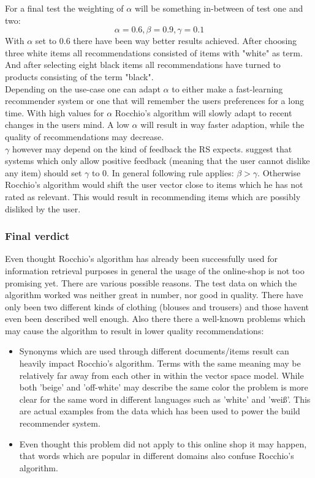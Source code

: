 \noindent
For a final test the weighting of $\alpha$ will be something in-between of test one and two:
$$\alpha = 0.6, \beta = 0.9, \gamma = 0.1$$
With $\alpha$ set to 0.6 there have been way better results achieved.
After choosing three white items all recommendations consisted of items with "white" as term.
\\
And after selecting eight black items all recommendations have turned to products consisting of the term "black".
\\

\noindent
Depending on the use-case one can adapt $\alpha$ to either make a fast-learning recommender system or one that will remember the users preferences for a long time.
With high values for $\alpha$ Rocchio's algorithm will slowly adapt to recent changes in the users mind.
A low $\alpha$ will result in way faster adaption, while the quality of recommendations may decrease.
\\

\noindent
$\gamma$ however may depend on the kind of feedback the RS expects.
\citeauthor{manning:2009} suggest that systems which only allow positive feedback (meaning that the user cannot dislike any item) should set $\gamma$ to 0.\citep[p.~183]{manning:2009}
In general following rule applies: $\beta > \gamma$.
Otherwise Rocchio's algorithm would shift the user vector close to items which he has not rated as relevant.
This would result in recommending items which are possibly disliked by the user.



\subsubsection{Final verdict}
Even thought Rocchio's algorithm has already been successfully used for information retrieval purposes in general \citep[p.~183]{manning:2009} the usage of the online-shop is not too promising yet.
There are various possible reasons.
The test data on which the algorithm worked was neither great in number, nor good in quality.
There have only been two different kinds of clothing (blouses and trousers) and those havent even been described well enough.
Also there there a well-known problems which may cause the algorithm to result in lower quality recommendations:
\begin{itemize}
    \item Synonyms which are used through different documents/items result can heavily impact Rocchio's algorithm.
        Terms with the same meaning may be relatively far away from each other in within the vector space model.
        \citep[p.~184]{manning:2009}
        While both 'beige' and 'off-white' may describe the same color the problem is more clear for the same word in different languages such as 'white' and 'wei\ss{}'.
        This are actual examples from the data which has been used to power the build recommender system.

    \item Even thought this problem did not apply to this online shop it may happen, that words which are popular in different domains also confuse Rocchio's algorithm.
    \citep[p.~184]{manning:2009}
\end{itemize}

